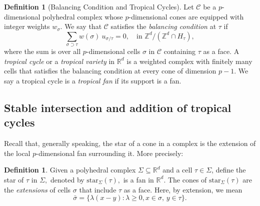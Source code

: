 \documentclass[11pt]{amsart}
\theoremstyle{definition}
\newtheorem{definition}[theorem]{Definition}
\newcommand{\R}{\mathbb{R}}
\newcommand{\Z}{\mathbb{Z}}
\newcommand{\cC}{\mathcal{C}}
\begin{document}
\begin{definition}[Balancing Condition and Tropical Cycles]\label{BalancingCondition}
Let $\mathscr{C}$ be a $p$-dimensional polyhedral complex whose $p$-dimensional cones are equipped with integer weights $w_{\sigma}$. We say that $\cC$ satisfies the \emph{balancing condition} at $\tau$ if
\[
\sum_{\sigma\supset \tau} w(\sigma)~ u_{\sigma/\tau}=0, \quad \text{in } \Z^d /(\Z^d \cap H_{\tau}),
\]
where the sum is over all $p$-dimensional cells $\sigma$ in $\mathcal{C}$ containing $\tau$ as a face. A  \emph{tropical cycle} or a \emph{tropical variety} in $\R^d$ is a weighted complex with finitely many cells that satisfies the balancing condition at every cone of dimension $p-1$. We say a tropical cycle is a \emph{tropical fan} if its support is a fan.
\end{definition}

\subsection{Stable intersection and addition of tropical cycles}



Recall that, generally speaking, the star of a cone in a complex is the extension of the local $p$-dimensional fan surrounding it. More precisely:

\begin{definition} Given a polyhedral complex $\Sigma \subseteq \mathbb{R}^d$ and a cell $\tau \in \Sigma$, define the star of $\tau$ in $\Sigma,$ denoted by $\text{star}_{\Sigma}(\tau),$ is a fan in $\mathbb{R}^d$. The cones of $\text{star}_{\Sigma}(\tau)$ are the \emph{extensions} of cells $\sigma$ that include $\tau$ as a face. Here, by extension, we mean
    \[
    \bar{\sigma} = \{\lambda (x - y) : \lambda \geq 0,  x \in \sigma,\, y \in \tau\}.
    \]
\end{definition}
\end{document}
